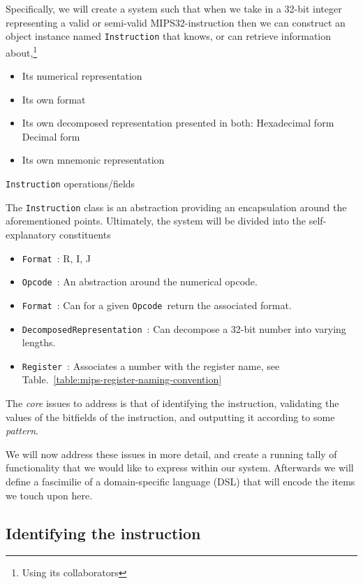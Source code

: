 \documentclass[a4paper]{article}
\newcommand{\opcodem}{\texttt{Opcode}\ }
\newcommand{\formatm}{\texttt{Format}\ }
\newcommand{\decomposedm}{\texttt{DecomposedRepresentation}\ }
\newcommand{\registerm}{\texttt{Register}\ }
\newcommand{\mij}[1]{\texttt{#1}}
\begin{document}
Specifically, we will create a system such that when we take in a
32-bit integer representing a valid or semi-valid MIPS32-instruction
then we can construct an object instance named \mij{Instruction} that
knows, or can retrieve information about,\footnote{Using its
collaborators}

\begin{table}
\begin{itemize}
\item Its numerical representation
\item Its own format
\item Its own decomposed representation presented in both:
\subitem Hexadecimal form
\subitem Decimal form
\item Its own mnemonic representation
\end{itemize}
\caption{\mij{Instruction} operations/fields}
\label{table:instruction-operations}
\end{table}

The \mij{Instruction} class is an abstraction providing an
encapsulation around the aforementioned points. Ultimately, the system
will be divided into the self-explanatory constituents

\begin{itemize}
\item \formatm: R, I, J
\item \opcodem: An abstraction around the numerical opcode.
\item \formatm: Can for a given \opcodem return the associated format.
\item \decomposedm: Can decompose a 32-bit number into varying lengths.
\item \registerm: Associates a number with the register name, 
      see Table.~\ref{table:mips-register-naming-convention}
\end{itemize}

The \emph{core} issues to address is that of identifying the
instruction, validating the values of the bitfields of the
instruction, and outputting it according to some \emph{pattern}.

We will now address these issues in more detail, and create a running
tally of functionality that we would like to express within our
system. Afterwards we will define a fascimilie of a domain-specific
language (DSL) that will encode the items we touch upon here.

\subsection{Identifying the instruction}\label{section:identification}
\end{document}
